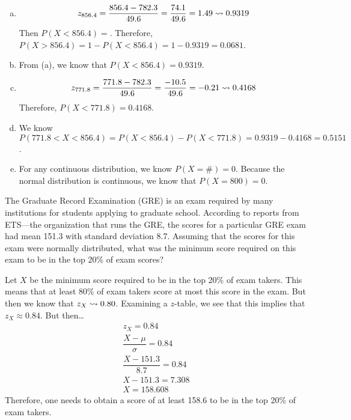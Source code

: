 \documentclass[11pt,letterpaper]{article}
\begin{document}
\sol 
\begin{enumerate}[(a)]
\item 
	\[
	z_{856.4}= \dfrac{856.4 - 782.3}{49.6}= \dfrac{74.1}{49.6}= 1.49 \rightsquigarrow 0.9319
	\]
Then $P(X < 856.4)= $. Therefore, $P(X > 856.4)= 1 - P(X < 856.4)= 1 - 0.9319= 0.0681$. \pspace

\item From (a), we know that $P(X < 856.4)= 0.9319$. \pspace

\item 
	\[
	z_{771.8}= \dfrac{771.8 - 782.3}{49.6}= \dfrac{-10.5}{49.6}= -0.21 \rightsquigarrow 0.4168
	\]
Therefore, $P(X < 771.8)= 0.4168$. \pspace

\item We know $P(771.8 < X < 856.4)= P(X < 856.4) - P(X < 771.8)= 0.9319 - 0.4168= 0.5151$. \pspace

\item For any continuous distribution, we know $P(X= \#)= 0$. Because the normal distribution is continuous, we know that $P(X= 800)= 0$. 
\end{enumerate}



\newpage



 The Graduate Record Examination (GRE) is an exam required by many institutions for students applying to graduate school. According to reports from ETS---the organization that runs the GRE, the scores for a particular GRE exam had mean 151.3 with standard deviation 8.7. Assuming that the scores for this exam were normally distributed, what was the minimum score required on this exam to be in the top 20\% of exam scores? \pspace

\sol Let $X$ be the minimum score required to be in the top 20\% of exam takers. This means that at least 80\% of exam takers score at most this score in the exam. But then we know that $z_X \rightsquigarrow 0.80$. Examining a $z$-table, we see that this implies that $z_X \approx 0.84$. But then\dots
	\[
	\begin{gathered}
	z_X= 0.84 \\[0.3cm]
	\dfrac{X - \mu}{\sigma}= 0.84 \\[0.3cm]
	\dfrac{X - 151.3}{8.7}= 0.84 \\[0.3cm]
	X - 151.3= 7.308 \\[0.3cm]
	X= 158.608
	\end{gathered}
	\]
Therefore, one needs to obtain a score of at least 158.6 to be in the top 20\% of exam takers. 
\end{document}
